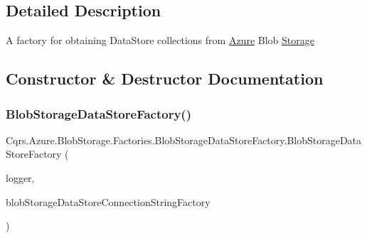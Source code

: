 \subsection{Detailed Description}
A factory for obtaining Data\+Store collections from \hyperlink{namespaceCqrs_1_1Azure}{Azure} Blob \hyperlink{namespaceCqrs_1_1Azure_1_1Storage}{Storage} 



\subsection{Constructor \& Destructor Documentation}
\mbox{\label{classCqrs_1_1Azure_1_1BlobStorage_1_1Factories_1_1BlobStorageDataStoreFactory_a448e77623db63d7a66fc6b6c75466eac_a448e77623db63d7a66fc6b6c75466eac}} 
\subsubsection{\texorpdfstring{Blob\+Storage\+Data\+Store\+Factory()}{BlobStorageDataStoreFactory()}}
{\footnotesize\ttfamily Cqrs.\+Azure.\+Blob\+Storage.\+Factories.\+Blob\+Storage\+Data\+Store\+Factory.\+Blob\+Storage\+Data\+Store\+Factory (\begin{DoxyParamCaption}\item[{I\+Logger}]{logger,  }\item[{\hyperlink{interfaceCqrs_1_1Azure_1_1BlobStorage_1_1DataStores_1_1IBlobStorageDataStoreConnectionStringFactory}{I\+Blob\+Storage\+Data\+Store\+Connection\+String\+Factory}}]{blob\+Storage\+Data\+Store\+Connection\+String\+Factory }\end{DoxyParamCaption})\hspace{0.3cm}{\ttfamily [protected]}}



